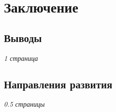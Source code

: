 \chapter{Заключение}

\section{Выводы}

\textit{1 страница}

\section{Направления развития}

\textit{0.5 страницы}
